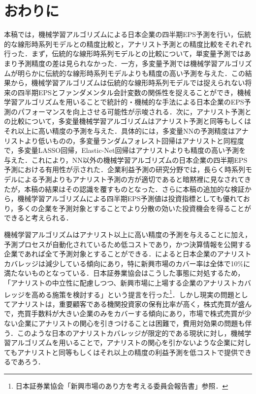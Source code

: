 \documentclass[a4paper，11pt]{jsarticle}
\begin{document}
\part{おわりに} \label{par:conclusion}

本稿では，機械学習アルゴリズムによる日本企業の四半期EPS予測を行い，伝統的な線形時系列モデルとの精度比較と，アナリスト予測との精度比較をそれぞれ行った．まず，伝統的な線形時系列モデルとの比較について，単変量予測ではあまり予測精度の差は見られなかった．一方，多変量予測では機械学習アルゴリズムが明らかに伝統的な線形時系列モデルよりも精度の高い予測を与えた．この結果から，機械学習アルゴリズムは伝統的な線形時系列モデルでは捉えられない将来の四半期EPSとファンダメンタル会計変数の関係性を捉えることができ，機械学習アルゴリズムを用いることで統計的・機械的な手法による日本企業のEPS予測のパフォーマンスを向上させる可能性が示唆される．次に，アナリスト予測との比較について，多変量機械学習アルゴリズムはアナリスト予測と同等もしくはそれ以上に高い精度の予測を与えた．具体的には，多変量NNの予測精度はアナリストより低いものの，多変量ランダムフォレスト回帰はアナリストと同程度で，多変量LASSO回帰，Elastic-Net回帰はアナリストよりも精度の高い予測を与えた．これにより，NN以外の機械学習アルゴリズムの日本企業の四半期EPS予測における有用性が示された．企業利益予測の研究分野では，長らく時系列モデルによる予測よりもアナリスト予測の方が適切であると暗黙裡に見なされてきたが，本稿の結果はその認識を覆すものとなった．さらに本稿の追加的な検証から，機械学習アルゴリズムによる四半期EPS予測値は投資指標としても優れており，多くの企業を予測対象とすることでより分散の効いた投資機会を得ることができると考えられる．

機械学習アルゴリズムはアナリスト以上に高い精度の予測を与えることに加え，予測プロセスが自動化されているため低コストであり，かつ決算情報を公開する企業であれば全て予測対象とすることができる．\cite{yoneyama2010}によると日本企業のアナリストカバレッジは減少している傾向にあり，特に新興市場のカバー率は全体で10\%に満たないものとなっている．日本証券業協会はこうした事態に対処するため，「アナリストの中立性に配慮しつつ、新興市場に上場する企業のアナリストカバレッジを高める施策を検討する」という提言を行った\footnote{日本証券業協会「新興市場のあり方を考える委員会報告書」参照．}．しかし現実の問題としてアナリストは，重要顧客である機関投資家の保有比率が高く，株式売買が盛んで，売買手数料が大きい企業のみをカバーする傾向にあり\citep{nakai2006}，市場で株式売買が少ない企業にアナリストの関心を引きつけることは困難で，費用対効果の問題も伴う．このような日本のアナリストカバレッジが限定的である現状に対し，機械学習アルゴリズムを用いることで，アナリストの関心を引かないような企業に対してもアナリストと同等もしくはそれ以上の精度の利益予測を低コストで提供できるであろう．
\end{document}
